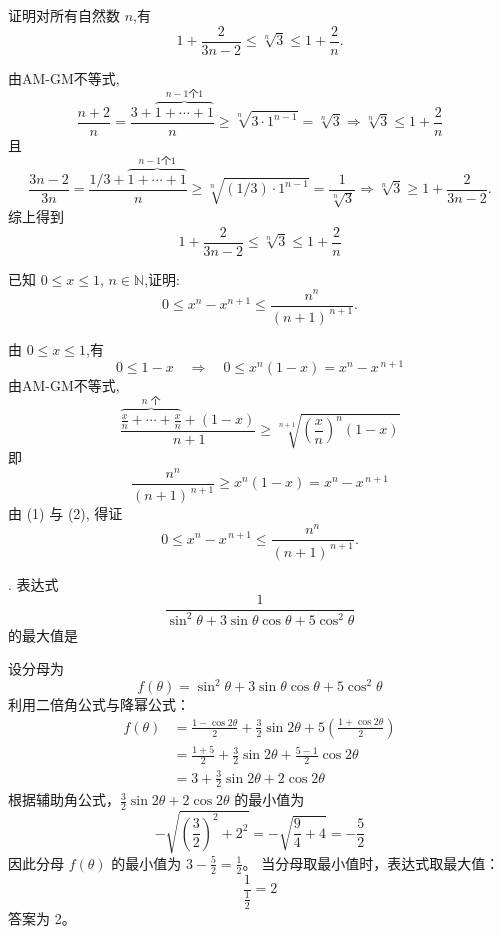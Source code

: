 \begin{questions}
    \question 证明对所有自然数 $n$,有
    \[
    1 + \frac{2}{3n-2} \le \sqrt[n]{3} \le 1 + \frac{2}{n}.
    \]
    \begin{solution}
        由AM-GM不等式,
        \[
        \frac{n+2}{n} = \frac{3 + \overbrace{1 + \cdots + 1}^{n-1 \text{个1}}}{n} \ge \sqrt[n]{3\cdot 1^{n-1}} = \sqrt[n]{3} \Rightarrow \sqrt[n]{3} \le 1 + \frac{2}{n}
        \]
        且
        \[
        \frac{3n-2}{3n} = \frac{1/3 + \overbrace{1 + \cdots + 1}^{n-1 \text{个1}}}{n} \ge \sqrt[n]{(1/3)\cdot 1^{n-1}} = \frac{1}{\sqrt[n]{3}} \Rightarrow \sqrt[n]{3} \ge  1 + \frac{2}{3n-2}.
        \]
        综上得到
        \[
        1 + \frac{2}{3n-2} \le \sqrt[n]{3} \le 1 + \frac{2}{n}
        \]
    \end{solution}

    \question 已知 $0 \le x \le 1$, $n \in \mathbb{N}$,证明:
    \[
    0 \le x^n - x^{n+1} \le \frac{n^n}{(n+1)^{\,n+1}}.
    \]
    \begin{solution}
        由 $0 \le x \le 1$,有
        \[
        0 \le 1-x \quad \Rightarrow \quad 0 \le x^n(1-x) = x^n - x^{\,n+1} \tag{1}
        \]
        由AM-GM不等式,
        \[
        \frac{\overbrace{\frac{x}{n} + \cdots + \frac{x}{n}}^{n \text{ 个}} + (1-x)}{\,n+1} \ge \sqrt[n+1]{\left(\frac{x}{n}\right)^n (1-x)} 
        \]
        即
        \[
        \frac{n^n}{(n+1)^{\,n+1}} \ge x^n(1-x) = x^n - x^{\,n+1} \tag{2}
        \]
        由 (1) 与 (2), 得证
        \[
        0 \le x^n - x^{\,n+1} \le \frac{n^n}{(n+1)^{\,n+1}}.
        \]
    \end{solution}

    . 表达式 \[
\frac{1}{\sin^{2} \theta + 3 \sin \theta \cos \theta + 5 \cos^{2} \theta}
\] 的最大值是

\begin{solution}
设分母为 \[
f(\theta) = \sin^{2} \theta + 3 \sin \theta \cos \theta + 5 \cos^{2} \theta
\]
利用二倍角公式与降幂公式：
\begin{align*}
f(\theta) &= \frac{1 - \cos 2\theta}{2} + \frac{3}{2} \sin 2\theta + 5 \left( \frac{1 + \cos 2\theta}{2} \right) \\
&= \frac{1 + 5}{2} + \frac{3}{2} \sin 2\theta + \frac{5 - 1}{2} \cos 2\theta \\
&= 3 + \frac{3}{2} \sin 2\theta + 2 \cos 2\theta
\end{align*}
根据辅助角公式，\(\frac{3}{2} \sin 2\theta + 2 \cos 2\theta\) 的最小值为 \[
-\sqrt{\left( \frac{3}{2} \right)^{2} + 2^{2}} = -\sqrt{\frac{9}{4} + 4} = -\frac{5}{2}
\]
因此分母 \(f(\theta)\) 的最小值为 \(3 - \frac{5}{2} = \frac{1}{2}\)。
当分母取最小值时，表达式取最大值：
\[
\frac{1}{\frac{1}{2}} = 2
\]
答案为 2。
\end{solution}


\end{questions}
